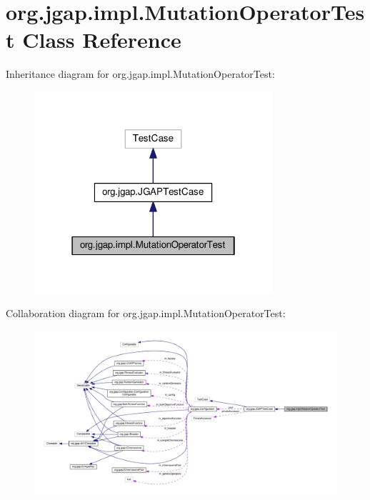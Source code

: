 \hypertarget{classorg_1_1jgap_1_1impl_1_1_mutation_operator_test}{\section{org.\-jgap.\-impl.\-Mutation\-Operator\-Test Class Reference}
\label{classorg_1_1jgap_1_1impl_1_1_mutation_operator_test}
}


Inheritance diagram for org.\-jgap.\-impl.\-Mutation\-Operator\-Test\-:
\nopagebreak
\begin{figure}[H]
\begin{center}
\leavevmode
\includegraphics[width=250pt]{classorg_1_1jgap_1_1impl_1_1_mutation_operator_test__inherit__graph}
\end{center}
\end{figure}


Collaboration diagram for org.\-jgap.\-impl.\-Mutation\-Operator\-Test\-:
\nopagebreak
\begin{figure}[H]
\begin{center}
\leavevmode
\includegraphics[width=350pt]{classorg_1_1jgap_1_1impl_1_1_mutation_operator_test__coll__graph}
\end{center}
\end{figure}
